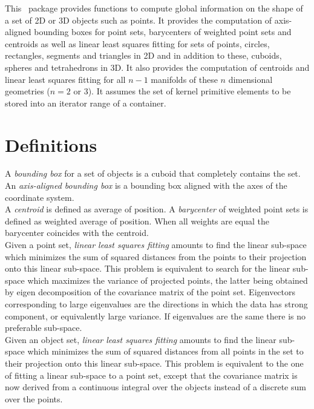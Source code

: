 This \cgal\ package provides functions to compute global information
on the shape of a set of 2D or 3D objects such as points. It provides the computation of axis-aligned bounding boxes for point sets, barycenters of weighted point sets and centroids as well as linear least squares fitting for sets of points, circles, rectangles, segments and triangles in 2D and in addition to these, cuboids, spheres and tetrahedrons in 3D. It also provides the computation of centroids and linear least squares fitting for all $n-1$ manifolds of these $n$ dimensional geometries ($n = 2$ or $3$). It assumes the set of kernel primitive elements to be stored into an iterator range of a container.\\

\section{Definitions}

A \emph{bounding box} for a set of objects is a cuboid that completely
contains the set. An \emph{axis-aligned bounding box} is a bounding box
aligned with the axes of the coordinate system.\\

A \emph{centroid} is defined as average of position. A \emph{barycenter} of weighted point sets is defined as weighted average of position. When all weights are equal the barycenter coincides with the centroid.\\

Given a point set, \emph{linear least squares fitting} amounts to
find the linear sub-space which minimizes the sum of squared
distances from the points to their projection onto this linear
sub-space. This problem is equivalent to search for the linear
sub-space which maximizes the variance of projected points, the latter
being obtained by eigen decomposition of the covariance
matrix of the point set. Eigenvectors corresponding to large eigenvalues are the
directions in which the data has strong component, or equivalently
large variance. If eigenvalues are the same there is no preferable
sub-space.\\

Given an object set, \emph{linear least squares fitting} amounts to find the linear sub-space which minimizes the sum of squared
distances from all points in the set to their projection onto this linear
sub-space. This problem is equivalent to the one of fitting a linear sub-space to a point set, except that the covariance matrix is now derived from a continuous integral over the objects instead of a discrete sum over the points.


